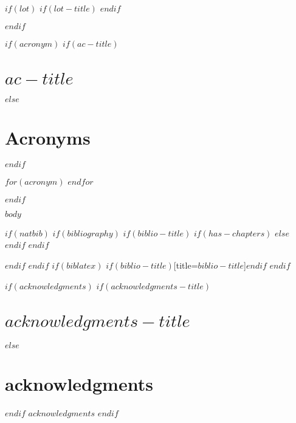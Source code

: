 \documentclass[
$if(fontsize)$
  $fontsize$,
$endif$
$if(lang)$
  $babel-lang$,
$endif$
$if(papersize)$
  $papersize$paper,
$endif$
$if(twoside)$
twoside,
$endif$
$if(openright)$
openright,
$endif$
$if(title)$
titlepage,
$endif$
numbers=noenddot,
headinclude,
footinclude,
cleardoublepage=empty,
abstract=on,
BCOR=5mm,
dvipsnames,
$for(classoption)$
  $classoption$$sep$,
$endfor$
]{scrreport}
\begin{document}
$if(lot)$
$if(lot-title)$
\renewcommand*\listtablename{$lot-title$}
$endif$
\listoftables
$endif$

$if(acronym)$
$if(ac-title)$
\chapter*{$ac-title$}
$else$
\chapter*{Acronyms}
$endif$
\begin{NoHyper}
\begin{acronym}[TDMA]
$for(acronym)$
$endfor$
\end{acronym}
\end{NoHyper}
\cleardoublepage
$endif$

\cleardoublepage
\pagestyle{scrheadings}

$body$

$if(natbib)$
$if(bibliography)$
$if(biblio-title)$
$if(has-chapters)$
\renewcommand\bibname{$biblio-title$}
$else$
\renewcommand\refname{$biblio-title$}
$endif$
$endif$
  

$endif$
$endif$
$if(biblatex)$
\printbibliography$if(biblio-title)$[title=$biblio-title$]$endif$
$endif$

$if(acknowledgments)$
$if(acknowledgments-title)$
\chapter*{$acknowledgments-title$}
$else$
\chapter*{acknowledgments}
$endif$
$acknowledgments$
$endif$
\end{document}
